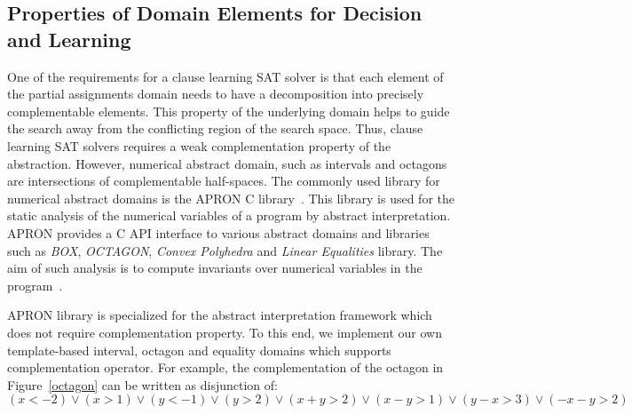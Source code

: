 

\subsection{Properties of Domain Elements for Decision and Learning}
One of the requirements for a clause learning SAT solver 
is that each element of the partial assignments domain 
needs to have a decomposition into precisely complementable 
elements.  This property of the underlying domain helps to 
guide the search away from the conflicting region of the 
search space.
Thus, clause learning SAT solvers requires a weak complementation property
of the abstraction.  However, numerical abstract domain,  such as 
intervals and octagons are intersections of complementable half-spaces. 
The commonly used library for numerical abstract domains  
is the APRON C library~\cite{apron}.  This library is 
used for the static analysis of the numerical variables 
of a program by abstract interpretation. APRON provides a 
C API interface to various abstract domains and libraries 
such as {\em BOX}, {\em OCTAGON}, {\em Convex Polyhedra} and
{\em Linear Equalities} library.  The aim of such analysis is 
to compute invariants over numerical variables in the 
program~\cite{se2011}. 

APRON library is specialized for the abstract interpretation 
framework which does not require complementation property.  
To this end, we implement our own template-based 
interval, octagon and equality domains which supports 
complementation operator.  
For example, the complementation of the octagon in Figure~\ref{octagon} can be written as disjunction of:
\[(x<-2) \lor (x>1) \lor (y<-1) \lor (y>2) \lor (x+y>2) \lor (x-y>1) \lor (y-x>3) \lor (-x-y>2)\]

